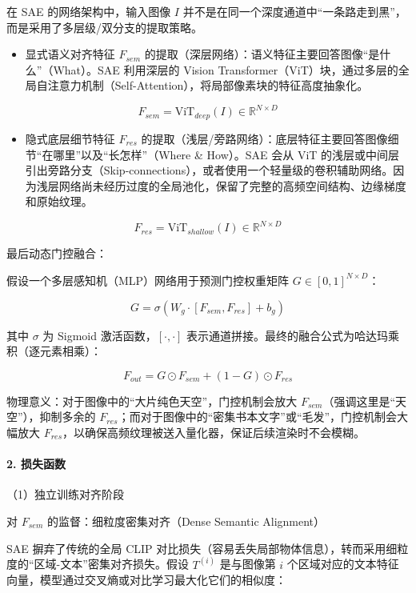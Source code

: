 在 SAE 的网络架构中，输入图像 \(I\) 并不是在同一个深度通道中``一条路走到黑''，而是采用了多层级/双分支的提取策略。

\begin{itemize}
\tightlist
\item
  显式语义对齐特征 \(F_{sem}\) 的提取（深层网络）：语义特征主要回答图像``是什么''（What）。SAE 利用深层的 Vision Transformer（ViT）块，通过多层的全局自注意力机制（Self-Attention），将局部像素块的特征高度抽象化。
\end{itemize}

\[
F_{sem}=\mathrm{ViT}_{deep}(I)\in \mathbb{R}^{N\times D}
\]

\begin{itemize}
\tightlist
\item
  隐式底层细节特征 \(F_{res}\) 的提取（浅层/旁路网络）：底层特征主要回答图像细节``在哪里''以及``长怎样''（Where \& How）。SAE 会从 ViT 的浅层或中间层引出旁路分支（Skip-connections），或者使用一个轻量级的卷积辅助网络。因为浅层网络尚未经历过度的全局池化，保留了完整的高频空间结构、边缘梯度和原始纹理。
\end{itemize}

\[
F_{res}=\mathrm{ViT}_{shallow}(I)\in \mathbb{R}^{N\times D}
\]

最后动态门控融合：

假设一个多层感知机（MLP）网络用于预测门控权重矩阵 \(G\in[0,1]^{N\times D}\)：

\[
G=\sigma(W_g\cdot [F_{sem},F_{res}]+b_g)
\]

其中 \(\sigma\) 为 Sigmoid 激活函数，\([\cdot,\cdot]\) 表示通道拼接。最终的融合公式为哈达玛乘积（逐元素相乘）：

\[
F_{out}=G\odot F_{sem}+(1-G)\odot F_{res}
\]

物理意义：对于图像中的``大片纯色天空''，门控机制会放大 \(F_{sem}\)（强调这里是``天空''），抑制多余的 \(F_{res}\)；而对于图像中的``密集书本文字''或``毛发''，门控机制会大幅放大 \(F_{res}\)，以确保高频纹理被送入量化器，保证后续渲染时不会模糊。

\hypertarget{ux635fux5931ux51fdux6570}{%
\paragraph{2. 损失函数}\label{ux635fux5931ux51fdux6570}}

（1）独立训练对齐阶段

对 \(F_{sem}\) 的监督：细粒度密集对齐（Dense Semantic Alignment）

SAE 摒弃了传统的全局 CLIP 对比损失（容易丢失局部物体信息），转而采用细粒度的``区域-文本''密集对齐损失。假设 \(T^{(i)}\) 是与图像第 \(i\) 个区域对应的文本特征向量，模型通过交叉熵或对比学习最大化它们的相似度：

